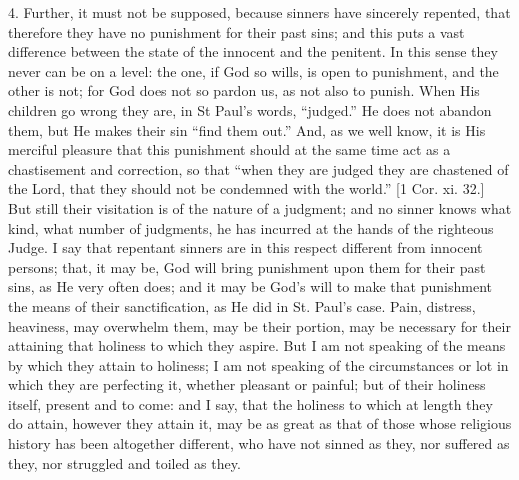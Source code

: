 4. Further, it must not be supposed, because sinners have sincerely
repented, that therefore they have no punishment for their past sins;
and this puts a vast difference between the state of the innocent and
the penitent. In this sense they never can be on a level: the one, if
God so wills, is open to punishment, and the other is not; for God
does not so pardon us, as not also to punish. When His children go
wrong they are, in St Paul's words, ``judged.'' He does not
abandon them, but He makes their sin ``find them out.'' And,
as we well know, it is His merciful pleasure that this punishment
should at the same time act as a chastisement and correction, so that
``when they are judged they are chastened of the Lord, that they
should not be condemned with the world.'' [1 Cor. xi. 32.] But
still their visitation is of the nature of a judgment; and no sinner
knows what kind, what number of judgments, he has incurred at the
hands of the righteous Judge. I say that repentant sinners are in this
respect different from innocent persons; that, it may be, God will
bring punishment upon them for their past sins, as He very often does;
and it may be God's will to make that punishment the means of their
sanctification, as He did in St. Paul's case. Pain, distress,
heaviness, may overwhelm them, may be their portion, may be necessary
for their attaining that holiness to which they aspire. But I am not
speaking of the means by which they attain to holiness; I am not
speaking of the circumstances or lot in which they are perfecting it,
whether pleasant or painful; but of their holiness itself, present and
to come: and I say, that the holiness to which at length they do
attain, however they attain it, may be as great as that of those whose
religious history has been altogether different, who have not sinned
as they, nor suffered as they, nor struggled and toiled as they.

